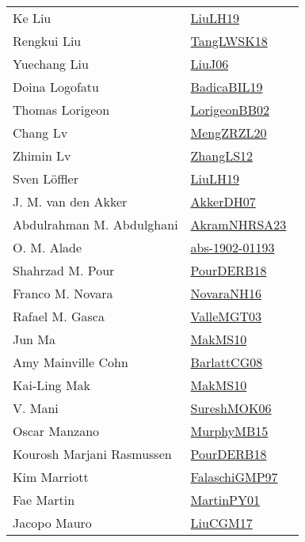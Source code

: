 {\begin{longtable}{p{4cm}p{20cm}}
Ke Liu & \href{works/LiuLH19.pdf}{LiuLH19}~\cite{LiuLH19}\\
Rengkui Liu & \href{works/TangLWSK18.pdf}{TangLWSK18}~\cite{TangLWSK18}\\
Yuechang Liu & \href{works/LiuJ06.pdf}{LiuJ06}~\cite{LiuJ06}\\
Doina Logofatu & \href{works/BadicaBIL19.pdf}{BadicaBIL19}~\cite{BadicaBIL19}\\
Thomas Lorigeon & \href{}{LorigeonBB02}~\cite{LorigeonBB02}\\
Chang Lv & \href{works/MengZRZL20.pdf}{MengZRZL20}~\cite{MengZRZL20}\\
Zhimin Lv & \href{works/ZhangLS12.pdf}{ZhangLS12}~\cite{ZhangLS12}\\
Sven L{\"{o}}ffler & \href{works/LiuLH19.pdf}{LiuLH19}~\cite{LiuLH19}\\
J. M. van den Akker & \href{works/AkkerDH07.pdf}{AkkerDH07}~\cite{AkkerDH07}\\
Abdulrahman M. Abdulghani & \href{works/AkramNHRSA23.pdf}{AkramNHRSA23}~\cite{AkramNHRSA23}\\
O. M. Alade & \href{works/abs-1902-01193.pdf}{abs-1902-01193}~\cite{abs-1902-01193}\\
Shahrzad M. Pour & \href{works/PourDERB18.pdf}{PourDERB18}~\cite{PourDERB18}\\
Franco M. Novara & \href{works/NovaraNH16.pdf}{NovaraNH16}~\cite{NovaraNH16}\\
Rafael M. Gasca & \href{works/ValleMGT03.pdf}{ValleMGT03}~\cite{ValleMGT03}\\
Jun Ma & \href{works/MakMS10.pdf}{MakMS10}~\cite{MakMS10}\\
Amy Mainville Cohn & \href{works/BarlattCG08.pdf}{BarlattCG08}~\cite{BarlattCG08}\\
Kai{-}Ling Mak & \href{works/MakMS10.pdf}{MakMS10}~\cite{MakMS10}\\
V. Mani & \href{}{SureshMOK06}~\cite{SureshMOK06}\\
Oscar Manzano & \href{works/MurphyMB15.pdf}{MurphyMB15}~\cite{MurphyMB15}\\
Kourosh Marjani Rasmussen & \href{works/PourDERB18.pdf}{PourDERB18}~\cite{PourDERB18}\\
Kim Marriott & \href{works/FalaschiGMP97.pdf}{FalaschiGMP97}~\cite{FalaschiGMP97}\\
Fae Martin & \href{works/MartinPY01.pdf}{MartinPY01}~\cite{MartinPY01}\\
Jacopo Mauro & \href{works/LiuCGM17.pdf}{LiuCGM17}~\cite{LiuCGM17}\\

\end{longtable}}
